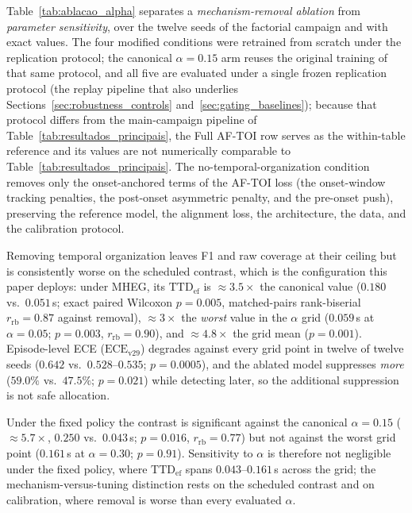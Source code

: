 \documentclass[a4paper,fleqn]{cas-dc}
\newcommand{\MHEG}{\mbox{MHEG}\xspace}
\begin{document}
{\color{\revcolor}Table~\ref{tab:ablacao_alpha} separates a
\emph{mechanism-removal ablation} from \emph{parameter sensitivity}, over the
twelve seeds of the factorial campaign and with exact values. The four
modified conditions were retrained from scratch under the replication
protocol; the canonical $\alpha{=}0.15$ arm reuses the original training of
that same protocol, and all five are evaluated
under a single frozen replication protocol (the replay pipeline that also underlies
Sections~\ref{sec:robustness_controls} and~\ref{sec:gating_baselines}); because that
protocol differs from the main-campaign pipeline of
Table~\ref{tab:resultados_principais}, the Full \mbox{AF-TOI} row serves as
the within-table reference and its values are not numerically comparable to
Table~\ref{tab:resultados_principais}. The
no-temporal-organization condition removes only the onset-anchored terms of
the \mbox{AF-TOI} loss (the onset-window tracking penalties, the post-onset
asymmetric penalty, and the pre-onset push), preserving the reference model,
the alignment loss, the architecture, the data, and the calibration protocol.

Removing temporal organization leaves F1 and raw coverage at their ceiling
but is consistently worse on the scheduled contrast, which is the
configuration this paper deploys: under \MHEG, its
$\mathrm{TTD}_{\mathrm{ef}}$ is ${\approx}3.5\times$ the canonical value
($0.180$ vs.\ $0.051$\,s; exact paired Wilcoxon $p=0.005$, matched-pairs
rank-biserial $r_{\mathrm{rb}}=0.87$ against removal), ${\approx}3\times$
the \emph{worst} value in the $\alpha$
grid ($0.059$\,s at $\alpha=0.05$; $p=0.003$, $r_{\mathrm{rb}}=0.90$), and
${\approx}4.8\times$ the grid mean ($p=0.001$). Episode-level ECE ($\mathrm{ECE}_{\mathrm{v29}}$) degrades
against every grid point in twelve of twelve seeds ($0.642$ vs.\
$0.528$--$0.535$; $p=0.0005$), and the ablated model suppresses \emph{more}
($59.0\%$ vs.\ $47.5\%$; $p=0.021$) while detecting later, so the additional
suppression is not safe allocation.

Under the fixed policy the contrast is
significant against the canonical $\alpha=0.15$ (${\approx}5.7\times$,
$0.250$ vs.\ $0.043$\,s; $p=0.016$, $r_{\mathrm{rb}}=0.77$) but not against the worst
grid point ($0.161$\,s at $\alpha=0.30$; $p=0.91$). Sensitivity to $\alpha$
is therefore not negligible under the fixed policy, where
$\mathrm{TTD}_{\mathrm{ef}}$ spans $0.043$--$0.161$\,s across the grid; the
mechanism-versus-tuning distinction rests on the scheduled contrast and on
calibration, where removal is worse than every evaluated $\alpha$.}
\end{document}
